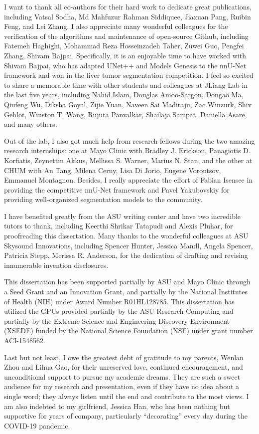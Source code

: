 \begin{acknowledgements}
I want to thank all co-authors for their hard work to dedicate great publications, including Vatsal Sodha, Md Mahfuzur Rahman Siddiquee, Jiaxuan Pang, Ruibin Feng, and Lei Zhang. I also appreciate many wonderful colleagues for the verification of the algorithms and maintenance of open-source Github, including Fatemeh Haghighi, Mohammad Reza Hosseinzadeh Taher, Zuwei Guo, Pengfei Zhang, Shivam Bajpai. Specifically, it is an enjoyable time to have worked with Shivam Bajpai, who has adapted UNet++ and Models Genesis to the nnU-Net framework and won in the liver tumor segmentation competition. I feel so excited to share a memorable time with other students and colleagues at JLiang Lab in the last five years, including Nahid Islam, Douglas Amoo-Sargon, Dongao Ma, Qiufeng Wu, Diksha Goyal, Zijie Yuan, Naveen Sai Madiraju, Zac Winzurk, Shiv Gehlot, Winston T. Wang, Rujuta Panvalkar, Shailaja Sampat, Daniella Asare, and many others. 


Out of the lab, I also got much help from research fellows during the two amazing research internships: one at Mayo Clinic with Bradley J. Erickson, Panagiotis D. Korfiatis, Zeynettin Akkus, Mellissa S. Warner, Marius N. Stan, and the other at CHUM with An Tang, Milena Cerny, Lisa Di Jorio, Eugene Vorontsov, Emmanuel Montagnon. Besides, I really appreciate the effort of Fabian Isensee in providing the competitive nnU-Net framework and Pavel Yakubovskiy for providing well-organized segmentation models to the community.


I have benefited greatly from the ASU writing center and have two incredible tutors to thank, including Keerthi Shrikar Tatapudi and Alexis Pluhar, for proofreading this dissertation. 
Many thanks to the wonderful colleagues at ASU Skysound Innovations, including Spencer Hunter, Jessica Mandl, Angela Spencer, Patricia Stepp, Merissa R. Anderson, for the dedication of drafting and revising innumerable invention disclosures.

This dissertation has been supported partially by ASU and Mayo Clinic through a Seed Grant and an Innovation Grant, and partially by the National Institutes of Health (NIH) under Award Number R01HL128785. This dissertation has utilized the GPUs provided partially by the ASU Research Computing and partially by the Extreme Science and Engineering Discovery Environment (XSEDE) funded by the National Science Foundation (NSF) under grant number ACI-1548562.


Last but not least, I owe the greatest debt of gratitude to my parents, Wenlan Zhou and Lihua Gao, for their unreserved love, continued encouragement, and unconditional support to pursue my academic dreams. They are such a sweet audience for my research and presentation, even if they have no idea about a single word; they always listen until the end and contribute to the most views. 
I am also indebted to my girlfriend, Jessica Han, who has been nothing but supportive for years of company, particularly ``decorating'' every day during the COVID-19 pandemic.


\end{acknowledgements}